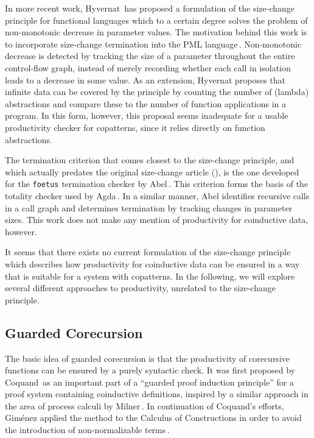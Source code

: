 In more recent work, Hyvernat\,\citep{Hyvernat13} has proposed a formulation of the size-change principle for functional languages which to a certain degree solves the problem of non-monotonic decrease in parameter values. The motivation behind this work is to incorporate size-change termination into the PML language\,\cite{PMLLanguage}. Non-monotonic decrease is detected by tracking the size of a parameter throughout the entire control-flow graph, instead of merely recording whether each call in isolation leads to a decrease in some value. As an extension, Hyvernat proposes that infinite data can be covered by the principle by counting the number of (lambda) abstractions and compare these to the number of function applications in a program. In this form, however, this proposal seems inadequate for a usable productivity checker for copatterns, since it relies directly on function abstractions.

The termination criterion that comes closest to the size-change principle, and which actually predates the original size-change article (\citep{LeeJones01SizeChange}), is the one developed for the \texttt{foetus} termination checker by Abel\,\citep{Abel98foetus}. This criterion forms the basis of the totality checker used by Agda\,\citep{Norell:thesis}. In a similar manner, Abel identifies recursive calls in a call graph and determines termination by tracking changes in parameter sizes. This work does not make any mention of productivity for coinductive data, however.

It seems that there exists no current formulation of the size-change principle which describes how productivity for coinductive data can be ensured in a way that is suitable for a system with copatterns. In the following, we will explore several different approaches to productivity, unrelated to the size-change principle.

\subsection{Guarded Corecursion}
The basic idea of guarded corecursion is that the productivity of corecursive functions can be ensured by a purely syntactic check. It was first proposed by Coquand\,\citep{Coquand94} as an important part of a ``guarded proof induction principle'' for a proof system containing coinductive definitions, inspired by a similar approach in the area of process calculi by Milner\,\citep{Milner82}. In continuation of Coquand's efforts, Gim\'{e}nez applied the method to the Calculus of Constructions in order to avoid the introduction of non-normalizable terms\,\citep{Gimenez95}. 

